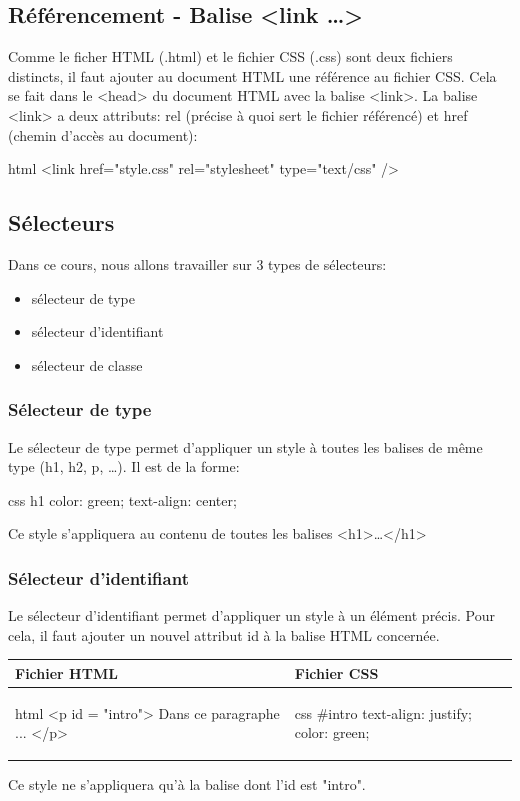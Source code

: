 \documentclass[a4paper,11pt]{article}
\begin{document}
\subsection{Référencement - Balise <link \dots>}
Comme le ficher HTML (.html) et le fichier CSS (.css) sont deux fichiers distincts, il faut ajouter au document HTML une référence au fichier CSS. Cela se fait dans le <head> du document HTML avec la balise <link>.
La balise <link> a deux attributs: rel (précise à quoi sert le fichier référencé) et href (chemin d'accès au document):
\begin{code}{html}
<link href="style.css" rel="stylesheet" type="text/css" />
\end{code}

\subsection{Sélecteurs}
Dans ce cours, nous allons travailler sur 3 types de sélecteurs:
\begin{itemize}
\item sélecteur de type
\item sélecteur d'identifiant
\item sélecteur de classe
\end{itemize}

\subsubsection{Sélecteur de type}
Le sélecteur de type permet d'appliquer un style à toutes les balises de même type (h1, h2, p, \dots).
Il est de la forme: \par
\begin{code}{css}
h1 {
  color: green;
  text-align: center;
}
\end{code}\par
Ce style s'appliquera au contenu de toutes les balises <h1>…</h1>

\subsubsection{Sélecteur d'identifiant}
Le sélecteur d'identifiant permet d'appliquer un style à un élément précis. Pour cela, il faut ajouter un nouvel attribut id à la balise HTML concernée.\par

\begin{tabular}{|l|l|}
\hline
\centering Fichier HTML & Fichier CSS \tabularnewline
\hline
\begin{minipage}{1\textwidth}
\begin{code}{html}
<p id = "intro">
  Dans ce paragraphe ...
</p>
\end{code}
\end{minipage}&
\begin{minipage}{1\textwidth}
\begin{code}{css}
#intro{
  text-align: justify;
  color: green;
}
\end{code}
\end{minipage}\tabularnewline
\hline
\end{tabular}\par
Ce style ne s'appliquera qu'à la balise dont l'id est "intro".
\end{document}
